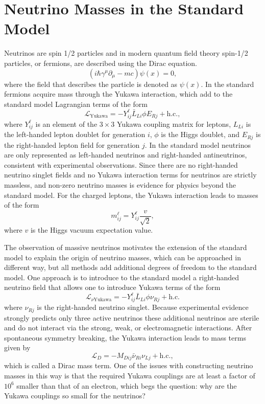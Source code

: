 \section{Neutrino Masses in the Standard Model}
\label{sec:chap2-nu-mass-sm}

Neutrinos are spin 1/2 particles and in modern quantum field theory spin-1/2 particles, or fermions, are described using the Dirac equation. 
\begin{equation}
    (i\hbar\gamma^\mu\partial_\mu-mc)\psi(x)=0, 
\end{equation}
where the field that describes the particle is denoted as $\psi(x)$. In the standard fermions acquire mass through the Yukawa interaction, which add to the standard model Lagrangian terms of the form 
\begin{equation}
    \mathcal{L}_\textrm{Yukawa}=-Y^\ell_{ij}\bar{L}_{Li}\phi E_{Rj}+\textrm{h.c.},
\end{equation}
where $Y_{ij}^\ell$ is an element of the $3\times3$ Yukawa coupling matrix for leptons, $L_{Li}$ is the left-handed lepton doublet for generation $i$, $\phi$ is the Higgs doublet, and $E_{Rj}$ is the right-handed lepton field for generation $j$. In the standard model neutrinos are only represented as left-handed neutrinos and right-handed antineutrinos, consistent with experimental observations. Since there are no right-handed neutrino singlet fields and no Yukawa interaction terms for neutrinos are strictly massless, and non-zero neutrino masses is evidence for physics beyond the standard model. For the charged leptons, the Yukawa interaction leads to masses of the form 
\begin{equation}
    m^\ell_{ij}=Y^\ell_{ij}\frac{v}{\sqrt{2}},
\end{equation}
where $v$ is the Higgs vacuum expectation value.

The observation of massive neutrinos motivates the extension of the standard model to explain the origin of neutrino masses, which can be approached in different way, but all methods add additional degrees of freedom to the standard model. One approach is to introduce to the standard model a right-handed neutrino field that allows one to introduce Yukawa terms of the form 
\begin{equation}
    \mathcal{L}_{\nu\textrm{Yukawa}} = -Y^\ell_{ij}\bar{L}_{Li}\phi \nu_{Rj}+\textrm{h.c.}
\end{equation}
where $\nu_{Rj}$ is the right-handed neutrino singlet. Because experimental evidence strongly predicts only three active neutrinos these additional neutrinos are sterile and do not interact via the strong, weak, or electromagnetic interactions. After spontaneous symmetry breaking, the Yukawa interaction leads to mass terms given by 
\begin{equation}
    \mathcal{L}_{D}=-M_{Dij}\bar{\nu}_{Ri}\nu_{Lj} +\textrm{h.c.},
\end{equation}
which is called a Dirac mass term. One of the issues with constructing neutrino masses in this way is that the required Yukawa couplings are at least a factor of $10^6$ smaller than that of an electron, which begs the question: why are the Yukawa couplings so small for the neutrinos?

